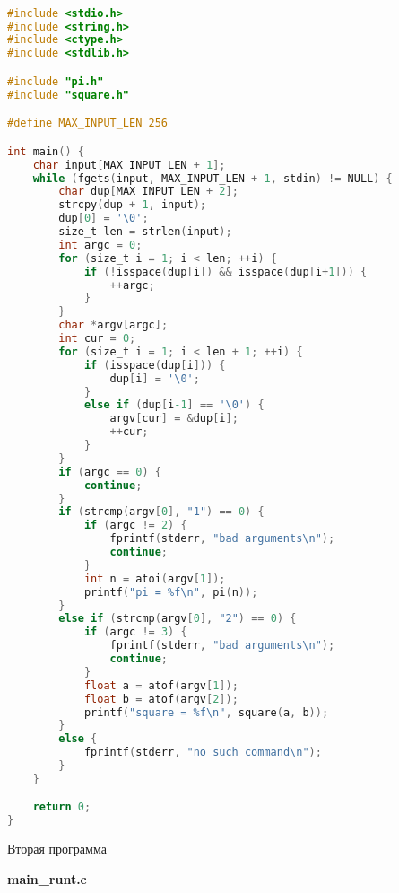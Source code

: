 \begin{lstlisting}[language=C]

#include <stdio.h>
#include <string.h>
#include <ctype.h>
#include <stdlib.h>

#include "pi.h"
#include "square.h"

#define MAX_INPUT_LEN 256

int main() {
    char input[MAX_INPUT_LEN + 1];
    while (fgets(input, MAX_INPUT_LEN + 1, stdin) != NULL) {
        char dup[MAX_INPUT_LEN + 2];
        strcpy(dup + 1, input);
        dup[0] = '\0';
        size_t len = strlen(input);
        int argc = 0;
        for (size_t i = 1; i < len; ++i) {
            if (!isspace(dup[i]) && isspace(dup[i+1])) {
                ++argc;
            }
        }
        char *argv[argc];
        int cur = 0;
        for (size_t i = 1; i < len + 1; ++i) {
            if (isspace(dup[i])) {
                dup[i] = '\0';
            }
            else if (dup[i-1] == '\0') {
                argv[cur] = &dup[i];
                ++cur;
            }
        }
        if (argc == 0) {
            continue;
        }
        if (strcmp(argv[0], "1") == 0) {
            if (argc != 2) {
                fprintf(stderr, "bad arguments\n");
                continue;
            }
            int n = atoi(argv[1]);
            printf("pi = %f\n", pi(n));
        }
        else if (strcmp(argv[0], "2") == 0) {
            if (argc != 3) {
                fprintf(stderr, "bad arguments\n");
                continue;
            }
            float a = atof(argv[1]);
            float b = atof(argv[2]);
            printf("square = %f\n", square(a, b));
        }
        else {
            fprintf(stderr, "no such command\n");
        }
    }

    return 0;
}

\end{lstlisting}

\pagebreak

{\large Вторая программа}

\textbf{main\_runt.c}

